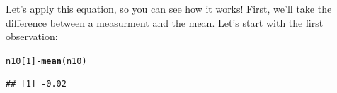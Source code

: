 \documentclass{tufte-handout}\usepackage[]{graphicx}\usepackage[]{color}
\makeatletter
\newcommand{\hlnum}[1]{\textcolor[rgb]{0.686,0.059,0.569}{#1}}%
\newcommand{\hlopt}[1]{\textcolor[rgb]{0,0,0}{#1}}%
\newcommand{\hlstd}[1]{\textcolor[rgb]{0.345,0.345,0.345}{#1}}%
\newcommand{\hlkwd}[1]{\textcolor[rgb]{0.737,0.353,0.396}{\textbf{#1}}}%
\newenvironment{kframe}{%
 \def\at@end@of@kframe{}%
 \ifinner\ifhmode%
  \def\at@end@of@kframe{\end{minipage}}%
  \begin{minipage}{\columnwidth}%
 \fi\fi%
 \def\FrameCommand##1{\hskip\@totalleftmargin \hskip-\fboxsep
 \colorbox{shadecolor}{##1}\hskip-\fboxsep
     \hskip-\linewidth \hskip-\@totalleftmargin \hskip\columnwidth}%
 \MakeFramed {\advance\hsize-\width
   \@totalleftmargin\z@ \linewidth\hsize
   \@setminipage}}%
 {\par\unskip\endMakeFramed%
 \at@end@of@kframe}
\newenvironment{knitrout}{}{} %
\makeatother
\begin{document}
Let's apply this equation, so you can see how it works! First, we'll take the difference between a measurment and the mean. Let's start with the first observation:
\begin{knitrout}
\color{fgcolor}\begin{kframe}
\begin{alltt}
\hlstd{n10[}\hlnum{1}\hlstd{]} \hlopt{-} \hlkwd{mean}\hlstd{(n10)}
\end{alltt}
\begin{verbatim}
## [1] -0.02
\end{verbatim}
\end{kframe}
\end{knitrout}
\end{document}
